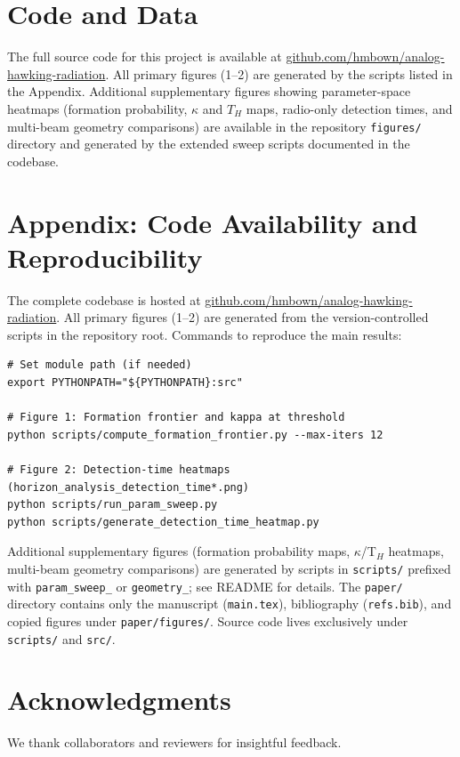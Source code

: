 \documentclass[11pt]{article}
\begin{document}
\section{Code and Data}
The full source code for this project is available at \href{https://github.com/hmbown/analog-hawking-radiation}{github.com/hmbown/analog-hawking-radiation}. All primary figures (1--2) are generated by the scripts listed in the Appendix. Additional supplementary figures showing parameter-space heatmaps (formation probability, $\kappa$ and $T_H$ maps, radio-only detection times, and multi-beam geometry comparisons) are available in the repository \texttt{figures/} directory and generated by the extended sweep scripts documented in the codebase.

\appendix
\section*{Appendix: Code Availability and Reproducibility}
The complete codebase is hosted at \href{https://github.com/hmbown/analog-hawking-radiation}{github.com/hmbown/analog-hawking-radiation}. All primary figures (1--2) are generated from the version-controlled scripts in the repository root. Commands to reproduce the main results:
\begin{verbatim}
# Set module path (if needed)
export PYTHONPATH="${PYTHONPATH}:src"

# Figure 1: Formation frontier and kappa at threshold
python scripts/compute_formation_frontier.py --max-iters 12

# Figure 2: Detection-time heatmaps (horizon_analysis_detection_time*.png)
python scripts/run_param_sweep.py
python scripts/generate_detection_time_heatmap.py
\end{verbatim}
Additional supplementary figures (formation probability maps, $\kappa$/T$_H$ heatmaps, multi-beam geometry comparisons) are generated by scripts in \texttt{scripts/} prefixed with \texttt{param\_sweep\_} or \texttt{geometry\_}; see README for details. The \texttt{paper/} directory contains only the manuscript (\texttt{main.tex}), bibliography (\texttt{refs.bib}), and copied figures under \texttt{paper/figures/}. Source code lives exclusively under \texttt{scripts/} and \texttt{src/}.

\section*{Acknowledgments}
We thank collaborators and reviewers for insightful feedback.



\end{document}
